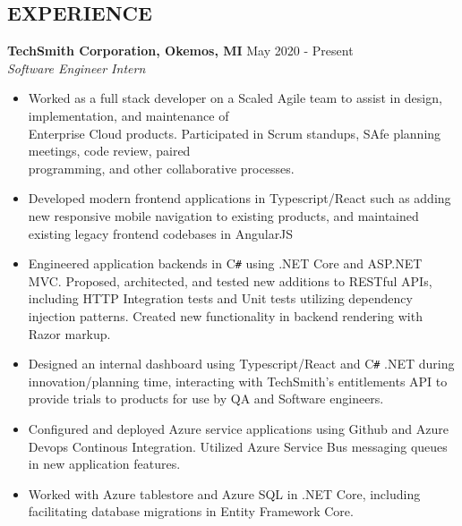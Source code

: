 \documentclass[overlapped]{res}
\begin{document}
\begin{resume}
    \section{EXPERIENCE}
    \textbf{TechSmith Corporation, Okemos, MI}
    \hfill May 2020 - Present \\
    {\sl Software Engineer Intern}
    \begin{itemize}  \itemsep -2pt %
        \item Worked as a full stack developer on a Scaled Agile team to assist in design, implementation, and maintenance of \\
        Enterprise Cloud products. Participated in Scrum standups, SAfe planning meetings, code review, paired \\
        programming, and other collaborative processes.
        \item Developed modern frontend applications in Typescript/React such as adding new responsive mobile navigation to existing products, and maintained existing legacy frontend codebases in AngularJS
        \item Engineered application backends in C\texttt{\#} using .NET Core and ASP.NET MVC. Proposed, architected, and tested new additions to RESTful APIs, including HTTP Integration tests and Unit tests utilizing dependency injection patterns. 
        Created new functionality in backend rendering with Razor markup.
        \item Designed an internal dashboard using Typescript/React and C\texttt{\#} .NET during innovation/planning time, interacting with TechSmith's entitlements API to provide trials to products for use by QA and Software engineers.
        \item Configured and deployed Azure service applications using Github and Azure Devops Continous Integration. Utilized Azure Service Bus messaging queues in new application features.
        \item Worked with Azure tablestore and Azure SQL in .NET Core, including facilitating database migrations in Entity Framework Core.
    \end{itemize}


\end{resume}
\end{document}

